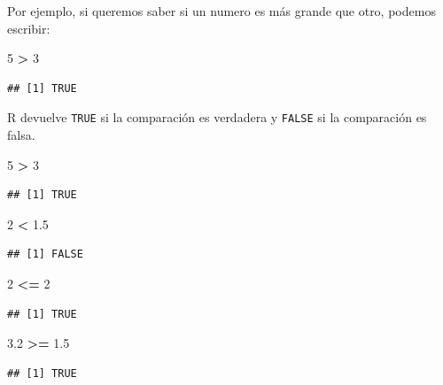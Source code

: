 \documentclass[
]{book}
\newenvironment{Shaded}{\begin{snugshade}}{\end{snugshade}}
\newcommand{\DecValTok}[1]{\textcolor[rgb]{0.00,0.00,0.81}{#1}}
\newcommand{\FloatTok}[1]{\textcolor[rgb]{0.00,0.00,0.81}{#1}}
\newcommand{\OperatorTok}[1]{\textcolor[rgb]{0.81,0.36,0.00}{\textbf{#1}}}
\newcommand{\StringTok}[1]{\textcolor[rgb]{0.31,0.60,0.02}{#1}}
\begin{document}
Por ejemplo, si queremos saber si un numero es más grande que otro, podemos escribir:

\begin{Shaded}
\begin{Highlighting}[]
\DecValTok{5} \OperatorTok{>}\StringTok{ }\DecValTok{3} 
\end{Highlighting}
\end{Shaded}

\begin{verbatim}
## [1] TRUE
\end{verbatim}

R devuelve \texttt{TRUE} si la comparación es verdadera y \texttt{FALSE} si la comparación es falsa.

\begin{Shaded}
\begin{Highlighting}[]
\DecValTok{5} \OperatorTok{>}\StringTok{ }\DecValTok{3}
\end{Highlighting}
\end{Shaded}

\begin{verbatim}
## [1] TRUE
\end{verbatim}

\begin{Shaded}
\begin{Highlighting}[]
\DecValTok{2} \OperatorTok{<}\StringTok{ }\FloatTok{1.5}
\end{Highlighting}
\end{Shaded}

\begin{verbatim}
## [1] FALSE
\end{verbatim}

\begin{Shaded}
\begin{Highlighting}[]
\DecValTok{2} \OperatorTok{<=}\StringTok{ }\DecValTok{2}
\end{Highlighting}
\end{Shaded}

\begin{verbatim}
## [1] TRUE
\end{verbatim}

\begin{Shaded}
\begin{Highlighting}[]
\FloatTok{3.2} \OperatorTok{>=}\StringTok{ }\FloatTok{1.5}
\end{Highlighting}
\end{Shaded}

\begin{verbatim}
## [1] TRUE
\end{verbatim}
\end{document}
